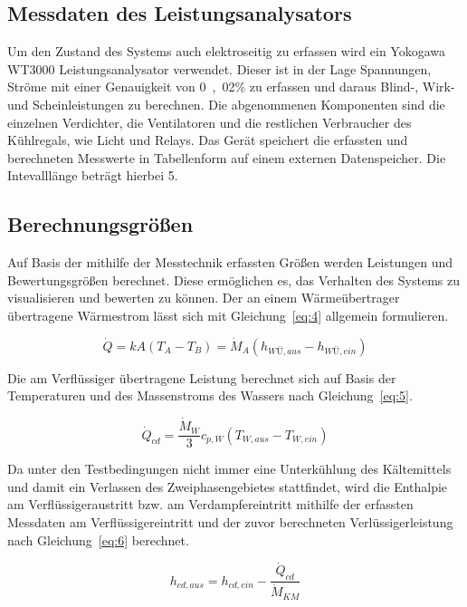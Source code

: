 \subsection{Messdaten des Leistungsanalysators}
\label{subsec:Messdaten des Leistungsanalysators}

Um den Zustand des Systems auch elektroseitig zu erfassen wird ein Yokogawa WT3000 Leistungsanalysator verwendet. Dieser ist in der Lage Spannungen, Ströme mit einer Genauigkeit von \unit{0,02}{\%} zu erfassen und daraus Blind-, Wirk- und Scheinleistungen zu berechnen. Die abgenommenen Komponenten sind die einzelnen Verdichter, die Ventilatoren und die restlichen Verbraucher des Kühlregals, wie Licht und Relays.
Das Gerät speichert die erfassten und berechneten Messwerte in Tabellenform auf einem externen Datenspeicher. Die Intevalllänge beträgt hierbei \unit{5}{\second}.


\subsection{Berechnungsgrößen}
\label{subsec:Berechnungsgrössen}

Auf Basis der mithilfe der Messtechnik erfassten Größen werden Leistungen und Bewertungsgrößen berechnet. Diese ermöglichen es, das Verhalten des Systems zu visualisieren und bewerten zu können.
Der an einem Wärmeübertrager übertragene Wärmestrom lässt sich mit Gleichung~\ref{eq:4} allgemein formulieren.

\begin{equation}
\label{eq:4}
\dot{Q}= kA(T_A - T_B) = \dot{M}_{A}(h_{WÜ,aus} - h_{WÜ,ein})
\end{equation}

Die am Verflüssiger übertragene Leistung berechnet sich auf Basis der Temperaturen und des Massenstroms des Wassers nach Gleichung~\ref{eq:5}.

\begin{equation}
\label{eq:5}
\dot{Q}_{cd}= \frac{\dot{M}_{W}}{3} c_{p,W} (T_{W,aus} - T_{W,ein})
\end{equation}

Da unter den Testbedingungen nicht immer eine Unterkühlung des Kältemittels und damit ein Verlassen des Zweiphasengebietes stattfindet, wird die Enthalpie am Verflüssigeraustritt bzw. am Verdampfereintritt mithilfe der erfassten Messdaten am Verflüssigereintritt und der zuvor berechneten Verlüssigerleistung nach Gleichung~\ref{eq:6} berechnet.

\begin{equation}
\label{eq:6}
h_{cd,aus} = h_{cd,ein} - \frac{\dot{Q}_{cd}}{\dot{M}_{KM}}
\end{equation}

